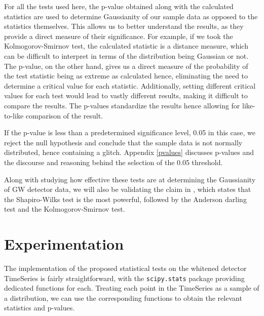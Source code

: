 \documentclass[12pt]{article}
\begin{document}
\noindent For all the tests used here, the p-value obtained along with the calculated statistics are used to determine Gaussianity of our sample data as opposed to the statistics themselves. This allows us to better understand the results, as they provide a direct measure of their significance. For example, if we took the Kolmogorov-Smirnov test, the calculated statistic is a distance measure, which can be difficult to interpret in terms of the distribution being Gaussian or not. The p-value, on the other hand, gives us a direct measure of the probability of the test statistic being as extreme as calculated hence, eliminating the need to determine a critical value for each statistic. Additionally, setting different critical values for each test would lead to vastly different results, making it difficult to compare the results. The p-values standardize the results hence allowing for like-to-like comparison of the result.

\medskip
\noindent If the p-value is less than a predetermined significance level, 0.05 in this case, we reject the null hypothesis and conclude that the sample data is not normally distributed, hence containing a glitch. Appendix \ref{pvalues} discusses p-values and the discourse and reasoning behind the selection of the 0.05 threshold.

\medskip
\noindent Along with studying how effective these tests are at determining the Gaussianity of GW detector data, we will also be validating the claim in \cite{razali2011power}, which states that the Shapiro-Wilks test is the most powerful, followed by the Anderson darling test and the Kolmogorov-Smirnov test.




\section{Experimentation}\label{Experimentation}

The implementation of the proposed statistical tests on the whitened detector TimeSeries is fairly straightforward, with the \texttt{scipy.stats} package providing dedicated functions for each. Treating each point in the TimeSeries as a sample of a distribution, we can use the corresponding functions to obtain the relevant statistics and p-values. 
\end{document}

